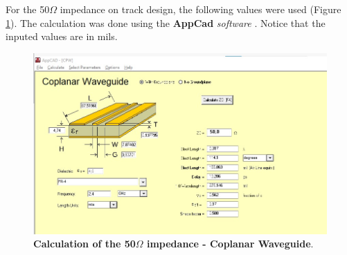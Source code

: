 For the  50$\Omega$ impedance on track design, the following values were used (Figure \ref{02fig:50ohmImpedanceDesignA}). The calculation was done using the 
\textbf{AppCad} \textit{software} \cite{AppCad}. Notice that the inputed values are in mils.


\begin{figure}[H]
    \centering
    \includegraphics[scale = 0.6]{imagens/50ohmImpedanceDesignA.png}
    \caption{\textbf{Calculation of the 50$\Omega$ impedance - Coplanar Waveguide}.}
    \label{02fig:50ohmImpedanceDesignA}
\end{figure}











